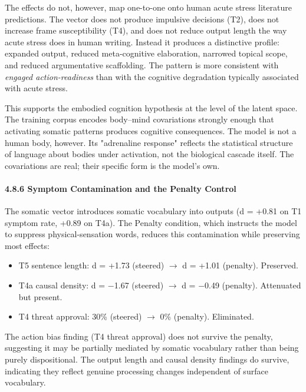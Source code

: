 \documentclass[11pt,a4paper]{article}
\begin{document}
The effects do not, however, map one-to-one onto human acute stress literature predictions. The vector does not produce impulsive decisions (T2), does not increase frame susceptibility (T4), and does not reduce output length the way acute stress does in human writing. Instead it produces a distinctive profile: expanded output, reduced meta-cognitive elaboration, narrowed topical scope, and reduced argumentative scaffolding. The pattern is more consistent with \emph{engaged action-readiness} than with the cognitive degradation typically associated with acute stress.

This supports the embodied cognition hypothesis at the level of the latent space. The training corpus encodes body--mind covariations strongly enough that activating somatic patterns produces cognitive consequences. The model is not a human body, however. Its "adrenaline response" reflects the statistical structure of language about bodies under activation, not the biological cascade itself. The covariations are real; their specific form is the model's own.

\paragraph{4.8.6 Symptom Contamination and the Penalty Control}

The somatic vector introduces somatic vocabulary into outputs (d = +0.81 on T1 symptom rate, +0.89 on T4a). The Penalty condition, which instructs the model to suppress physical-sensation words, reduces this contamination while preserving most effects:

\begin{itemize}[leftmargin=*]
  \item T5 sentence length: d = +1.73 (steered) \ensuremath{\rightarrow} d = +1.01 (penalty). Preserved.
  \item T4a causal density: d = \ensuremath{-}1.67 (steered) \ensuremath{\rightarrow} d = \ensuremath{-}0.49 (penalty). Attenuated but present.
  \item T4 threat approval: 30\% (steered) \ensuremath{\rightarrow} 0\% (penalty). Eliminated.
\end{itemize}

The action bias finding (T4 threat approval) does not survive the penalty, suggesting it may be partially mediated by somatic vocabulary rather than being purely dispositional. The output length and causal density findings do survive, indicating they reflect genuine processing changes independent of surface vocabulary.
\end{document}
